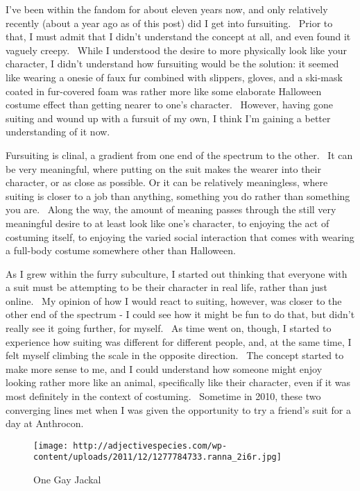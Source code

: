I've been within the fandom for about eleven years now, and only
relatively recently (about a year ago as of this post) did I get into
fursuiting. ~Prior to that, I must admit that I didn't understand the
concept at all, and even found it vaguely creepy. ~While I understood
the desire to more physically look like your character, I didn't
understand how fursuiting would be the solution: it seemed like wearing
a onesie of faux fur combined with slippers, gloves, and a ski-mask
coated in fur-covered foam was rather more like some elaborate Halloween
costume effect than getting nearer to one's character. ~However, having
gone suiting and wound up with a fursuit of my own, I think I'm gaining
a better understanding of it now.

Fursuiting is clinal, a gradient from one end of the spectrum to the
other. ~It can be very meaningful, where putting on the suit makes the
wearer into their character, or as close as possible. Or it can be
relatively meaningless, where suiting is closer to a job than anything,
something you do rather than something you are. ~Along the way, the
amount of meaning passes through the still very meaningful desire to at
least look like one's character, to enjoying the act of costuming
itself, to enjoying the varied social interaction that comes with
wearing a full-body costume somewhere other than Halloween.

As I grew within the furry subculture, I started out thinking that
everyone with a suit must be attempting to be their character in real
life, rather than just online. ~My opinion of how I would react to
suiting, however, was closer to the other end of the spectrum - I could
see how it might be fun to do that, but didn't really see it going
further, for myself. ~As time went on, though, I started to experience
how suiting was different for different people, and, at the same time, I
felt myself climbing the scale in the opposite direction. ~The concept
started to make more sense to me, and I could understand how someone
might enjoy looking rather more like an animal, specifically like their
character, even if it was most definitely in the context of costuming.
~Sometime in 2010, these two converging lines met when I was given the
opportunity to try a friend's suit for a day at Anthrocon.

\begin{figure}[htbp]
\centering
\texttt{[image: http://adjectivespecies.com/wp-content/uploads/2011/12/1277784733.ranna\_2i6r.jpg]}
\caption{One Gay Jackal}
\end{figure}

